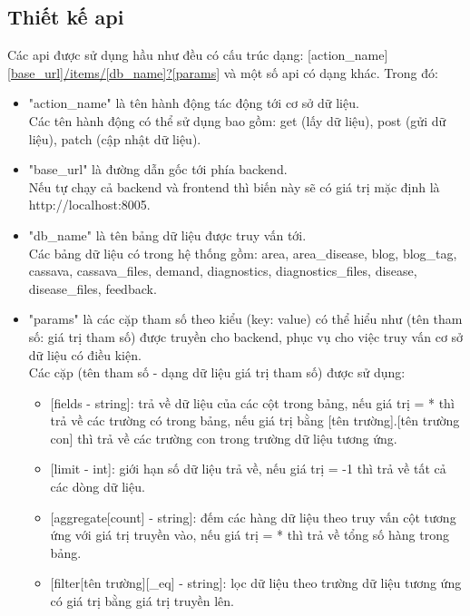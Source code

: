 \documentclass[./../main.tex]{subfiles}
\begin{document}
\subsection{Thiết kế \acrshort{api}}
Các \acrshort{api}  được sử dụng hầu như đều có cấu trúc dạng: [action\_name] \url{[base_url]/items/[db_name]?[params]} và một số \acrshort{api}  có dạng khác.
Trong đó:
\begin{itemize}
    \item "action\_name" là tên hành động tác động tới cơ sở dữ liệu.\\ Các tên hành động có thể sử dụng bao gồm: get (lấy dữ liệu), post (gửi dữ liệu), patch (cập nhật dữ liệu).
    \item "base\_url" là đường dẫn gốc tới phía backend.\\ Nếu tự chạy cả backend và frontend thì biến này sẽ có giá trị mặc định là http://localhost:8005.  
    \item "db\_name" là tên bảng dữ liệu được truy vấn tới.\\ Các bảng dữ liệu có trong hệ thống gồm: area, area\_disease, blog, blog\_tag, cassava, cassava\_files, demand, diagnostics, diagnostics\_files, disease, disease\_files, feedback.
    \item "params" là các cặp tham số theo kiểu (key: value) có thể hiểu như (tên tham số: giá trị tham số) được truyền cho backend, phục vụ cho việc truy vấn cơ sở dữ liệu có điều kiện.\\ Các cặp (tên tham số - dạng dữ liệu giá trị tham số) được sử dụng:
    \begin{itemize}
        \item{[fields - string]: trả về dữ liệu của các cột trong bảng, nếu giá trị = * thì trả về các trường có trong bảng, nếu giá trị bằng [tên trường].[tên trường con] thì trả về các trường con trong trường dữ liệu tương ứng.}
        \item{[limit - int]: giới hạn số dữ liệu trả về, nếu giá trị = -1 thì trả về tất cả các dòng dữ liệu.}
        \item{[aggregate[count] - string]: đếm các hàng dữ liệu theo truy vấn cột tương ứng với giá trị truyền vào, nếu giá trị = * thì trả về tổng số hàng trong bảng.}
        \item{[filter[tên trường][\_eq] - string]: lọc dữ liệu theo trường dữ liệu tương ứng có giá trị bằng giá trị truyền lên.}
    \end{itemize}
\end{itemize}
\end{document}
